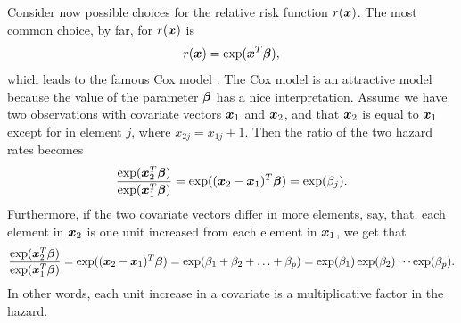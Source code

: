 Consider now possible choices for the relative risk function $r(\bm{x})$.
The most common choice, by far, for $r(\bm{x})$ is
\begin{equation*}
    r(\bm{x})=\exp(\bm{x}^T\boldsymbol{\beta}),
\end{equation*}
which leads to the famous Cox model \citep{cox-model}.
The Cox model is an attractive model because the value of the parameter $\boldsymbol{\beta}$ has a nice interpretation.
Assume we have two observations with covariate vectors $\bm{x}_1$ and $\bm{x}_2$, and that $\bm{x}_2$ is equal to $\bm{x}_1$ except for in element $j$, where $x_{2j}=x_{1j}+1$.
Then the ratio of the two hazard rates becomes
\begin{equation*}
    \frac{\exp(\bm{x}_2^T\boldsymbol{\beta})}{\exp(\bm{x}_1^T\boldsymbol{\beta})}=\exp((\bm{x}_2-\bm{x}_1)^T\boldsymbol{\beta})=\exp(\beta_j).
\end{equation*}
Furthermore, if the two covariate vectors differ in more elements, say, that, each element in $\bm{x}_2$ is one unit increased from each element in $\bm{x}_1$, we get that
\begin{equation*}
    \frac{\exp(\bm{x}_2^T\boldsymbol{\beta})}{\exp(\bm{x}_1^T\boldsymbol{\beta})}=\exp((\bm{x}_2-\bm{x}_1)^T\boldsymbol{\beta})=\exp(\beta_1+\beta_2+\ldots+\beta_p)=\exp(\beta_1)\exp(\beta_2)\cdots\exp(\beta_p).
\end{equation*}
In other words, each unit increase in a covariate is a multiplicative factor in the hazard.


